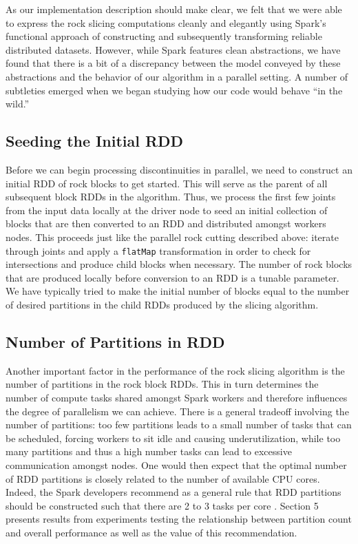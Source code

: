 As our implementation description should make clear, we felt that we were able to express the rock slicing computations cleanly and elegantly using Spark's functional approach of constructing and subsequently transforming reliable distributed datasets. However, while Spark features clean abstractions, we have found that there is a bit of a discrepancy between the model conveyed by these abstractions and the behavior of our algorithm in a parallel setting. A number of subtleties emerged when we began studying how our code would behave ``in the wild.''

\subsection{Seeding the Initial RDD}
Before we can begin processing discontinuities in parallel, we need to construct an initial RDD of rock blocks to get started. This will serve as the parent of all subsequent block RDDs in the algorithm. Thus, we process the first few joints from the input data locally at the driver node to seed an initial collection of blocks that are then converted to an RDD and distributed amongst workers nodes. This proceeds just like the parallel rock cutting described above: iterate through joints and apply a \texttt{flatMap} transformation in order to check for intersections and produce child blocks when necessary. The number of rock blocks that are produced locally before conversion to an RDD is a tunable parameter. We have typically tried to make the initial number of blocks equal to the number of desired partitions in the child RDDs produced by the slicing algorithm.

\subsection{Number of Partitions in RDD}
Another important factor in the performance of the rock slicing algorithm is the number of partitions in the rock block RDDs. This in turn determines the number of compute tasks shared amongst Spark workers and therefore influences the degree of parallelism we can achieve. There is a general tradeoff involving the number of partitions: too few partitions leads to a small number of tasks that can be scheduled, forcing workers to sit idle and causing underutilization, while too many partitions and thus a high number tasks can lead to excessive communication amongst nodes. One would then expect that the optimal number of RDD partitions is closely related to the number of available CPU cores. Indeed, the Spark developers recommend as a general rule that RDD partitions should be constructed such that there are 2 to 3 tasks per core \cite{sparkTuning}. Section 5 presents results from experiments testing the relationship between partition count and overall performance as well as the value of this recommendation.

